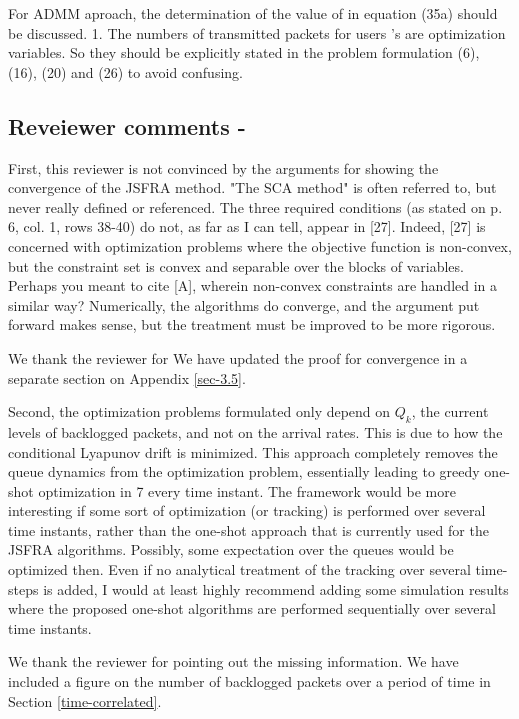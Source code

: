  For ADMM aproach, the determination of the value of \me{\rho} in equation (35a) should be discussed. 1. The numbers of transmitted packets for users  's are optimization variables. So they should be explicitly stated in the problem formulation (6), (16), (20) and (26) to avoid confusing.

\subsection*{Reveiewer comments - }

 First, this reviewer is not convinced by the arguments for showing the convergence of the JSFRA method. "The SCA method" is often referred to, but never really defined or referenced. The three required conditions (as stated on p. 6, col. 1, rows 38-40) do not, as far as I can tell, appear in [27]. Indeed, [27] is concerned with optimization problems where the objective function is non-convex, but the constraint set is convex and separable over the blocks of variables. Perhaps you meant to cite [A], wherein non-convex constraints are handled in a similar way? Numerically, the algorithms do converge, and the argument put forward makes sense, but the treatment must be improved to be more rigorous.

\resp We thank the reviewer for We have updated the proof for convergence in a separate section on Appendix \ref{sec-3.5}.

 Second, the optimization problems formulated only depend on $Q_k$, the current levels of backlogged packets, and not on the arrival rates. This is due to how the conditional Lyapunov drift is minimized. This approach completely removes the queue dynamics from the optimization problem, essentially leading to greedy one-shot optimization in 7
every time instant. The framework would be more interesting if some sort of optimization (or tracking) is performed over several time instants, rather than the one-shot approach that is currently used for the JSFRA algorithms. Possibly, some expectation over the queues would be optimized then. Even if no analytical treatment of the tracking over several time-steps is added, I would at least highly recommend adding some simulation results where the proposed one-shot algorithms are performed sequentially over several time instants.

\resp We thank the reviewer for pointing out the missing information. We have included a figure on the number of backlogged packets over a period of time in Section \ref{time-correlated}. 


